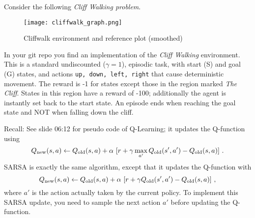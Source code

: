 

\renewcommand{\course}{Artificial Intelligence}
\renewcommand{\coursepicture}{course_ai}
\renewcommand{\coursedate}{Winter 2019}
\renewcommand{\exnum}{4}

\exercises
{}
\exercisestitle



Consider the following \textit{Cliff Walking problem}.

\begin{figure}[ht]
	\centering
        \texttt{[image: cliffwalk\_graph.png]}
        \caption{Cliffwalk environment and reference plot (smoothed)}
\end{figure}

\noindent
In your git repo you find an implementation of the \emph{Cliff
  Walking} environment. This is a standard undiscounted ($\gamma =
1$), episodic task, with start (S) and goal (G) states, and 
actions \texttt{up, down, left, right} that cause deterministic movement.
The reward is -1 for states except those in the region marked
\textit{The Cliff}. States in this region have a reward of -100; additionally the agent is instantly set back to the start state. An episode ends when
reaching the goal state and NOT when falling down the cliff.

Recall: See slide 06:12 for pseudo code of Q-Learning; it updates the Q-function using
$$
Q_{\text{new}}(s,a) \gets Q_{\text{old}}(s,a)
 + \alpha~ [r + \gamma \max_{a'} Q_{\text{old}}(s',a') - Q_{\text{old}}(s,a)] ~.$$
SARSA is exactly the same algorithm, except that it updates the Q-function with
$$Q_{\text{new}}(s,a) \gets Q_{\text{old}}(s,a)
 + \alpha~ [r + \gamma Q_{\text{old}}(s',a') - Q_{\text{old}}(s,a)] ~,$$
where $a'$ is the action actually taken by the current policy. To implement this SARSA update, you need to sample the next action $a'$ before updating the Q-function.

